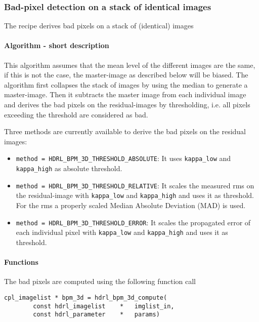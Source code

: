\subsubsection{Bad-pixel detection on a stack of identical images}
 The recipe derives bad pixels on a stack of (identical) images 

\paragraph{Algorithm  - short description}

This algorithm assumes that the mean level of the different images are
the same, if this is not the case, the master-image as described below
will be biased. The algorithm first collapses the stack of images by
using the median to generate a master-image. Then it subtracts the
master image from each individual image and derives the bad pixels on
the residual-images by thresholding, i.e. all pixels exceeding the
threshold are considered as bad.

Three methods are currently available to derive the bad pixels on the
residual images:

\begin{itemize}
\item \verb,method = HDRL_BPM_3D_THRESHOLD_ABSOLUTE,: It uses
  \verb,kappa_low, and \verb,kappa_high, as absolute threshold.
\item \verb,method = HDRL_BPM_3D_THRESHOLD_RELATIVE,: It scales the
  measured rms on the residual-image with \verb,kappa_low, and
  \verb,kappa_high, and uses it as threshold. For the rms a properly
  scaled Median Absolute Deviation (MAD) is used.
\item \verb,method = HDRL_BPM_3D_THRESHOLD_ERROR,: It scales the
  propagated error of each individual pixel with \verb,kappa_low, and
  \verb,kappa_high, and uses it as threshold.
\end{itemize}

\paragraph{Functions}

The bad pixels are computed using the following function call

\begin{lstlisting}
cpl_imagelist * bpm_3d = hdrl_bpm_3d_compute(
        const hdrl_imagelist    *   imglist_in,
        const hdrl_parameter    *   params)
\end{lstlisting}

